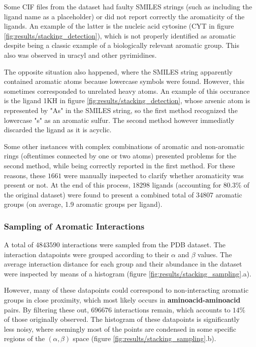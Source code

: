       Some CIF files from the dataset had faulty SMILES strings (such as including the ligand name as a placeholder) or did not report correctly the aromaticity of the ligands. An example of the latter is the nucleic acid cytosine (CYT in figure \ref{fig:results/stacking_detection}), which is not properly identified as aromatic despite being a classic example of a biologically relevant aromatic group. This also was observed in uracyl and other pyrimidines.

      The opposite situation also happened, where the SMILES string apparently contained aromatic atoms because lowercase symbols were found. However, this sometimes corresponded to unrelated heavy atoms. An example of this occurance is the ligand 1KH in figure \ref{fig:results/stacking_detection}, whose arsenic atom is represented by "As" in the SMILES string, so the first method recognized the lowercase "s" as an aromatic sulfur. The second method however immediatly discarded the ligand as it is acyclic.

      Some other instances with complex combinations of aromatic and non-aromatic rings (oftentimes connected by one or two atoms) presented problems for the second method, while being correctly reported in the first method. For these reasons, these $1661$ were manually inspected to clarify whether aromaticity was present or not. At the end of this process, $18298$ ligands (accounting for $80.3 \% $ of the original dataset) were found to present a combined total of $34807$ aromatic groups (on average, 1.9 aromatic groups per ligand).

    \subsubsection{Sampling of Aromatic Interactions}
      A total of $4843590$ interactions were sampled from the PDB dataset. The interaction datapoints were grouped according to their $\alpha$ and $\beta$ values. The average interaction distance for each group and their abundance in the dataset were inspected by means of a histogram (figure \ref{fig:results/stacking_sampling}.a).

      However, many of these datapoints could correspond to non-interacting aromatic groups in close proximity, which most likely occurs in \textbf{aminoacid-aminoacid} pairs. By filtering these out, $696676$ interactions remain, which accounts to $14 \%$ of those originally observed. The histogram of these datapoints is significantly less noisy, where seemingly most of the points are condensed in some specific regions of the $(\alpha, \beta)$ space (figure \ref{fig:results/stacking_sampling}.b).

